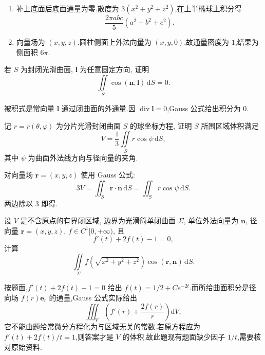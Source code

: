 \begin{solution}
    \leavevmode
    \begin{enumerate}
        \item 补上底面后底面通量为零.散度为 $3(x^2+y^2+z^2)$,在上半椭球上积分得
              \[
                  \dfrac{2\pi abc}{5}(a^2+b^2+c^2).
              \]
        \item 向量场为 $(x,y,z)$.圆柱侧面上外法向量为 $(x,y,0)$,故通量密度为 $1$,结果为侧面积 $6\pi$.
    \end{enumerate}
\end{solution}

\begin{example}
    若 $S$ 为封闭光滑曲面, $\bm l$ 为任意固定方向, 证明
    \[
        \displaystyle\iint\limits_S\cos(\bm n,\bm l)\,\mathrm{d}S=0.
    \]
\end{example}
\exampleblank

\begin{solution}
    被积式是常向量 $\bm l$ 通过闭曲面的外通量.因 $\operatorname{div}\bm l=0$,Gauss 公式给出积分为 $0$.
\end{solution}

\begin{example}
    记 $r=r(\theta,\varphi)$ 为分片光滑封闭曲面 $S$ 的球坐标方程, 证明 $S$ 所围区域体积满足
    \[
        V=\dfrac{1}{3}\iint\limits_Sr\cos\psi\,\mathrm{d}S,
    \]
    其中 $\psi$ 为曲面外法线方向与径向量的夹角.
\end{example}
\exampleblank

\begin{solution}
    对向量场 $\bm r=(x,y,z)$ 使用 Gauss 公式:
    \[
        3V=\iint_S\bm r\cdot\bm n\,\mathrm{d}S
        =\iint_Sr\cos\psi\,\mathrm{d}S.
    \]
    两边除以 $3$ 即得.
\end{solution}

\begin{example}
    设 $V$ 是不含原点的有界闭区域, 边界为光滑简单闭曲面 $\Sigma$, 单位外法向量为 $\bm n$, 径向量 $\bm r=(x,y,z)$, $f\in C^1\lbrack0,+\infty)$, 且
    \[
        f'(t)+2f(t)-1=0,
    \]
    计算
    \[
        \displaystyle\iint\limits_\Sigma f\left(\sqrt{x^2+y^2+z^2}\right)\cos(\bm r,\bm n)\,\mathrm{d}S.
    \]
\end{example}
\exampleblank

\begin{solution}
    按题面,$f'(t)+2f(t)-1=0$ 给出 $f(t)=1/2+Ce^{-2t}$.而所给曲面积分是径向场 $f(r)\bm e_r$ 的通量,Gauss 公式实际给出
    \[
        \displaystyle\iiint_V\left(f'(r)+\dfrac{2f(r)}{r}\right)\mathrm{d}V,
    \]
    它不能由题给常微分方程化为与区域无关的常数.若原方程应为 $f'(t)+2f(t)/t=1$,则答案才是 $V$ 的体积.故此题现有题面缺少因子 $1/t$,需要核对原始资料.
\end{solution}

